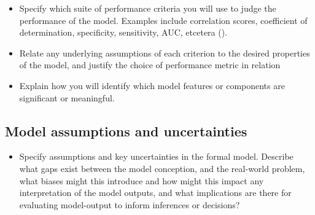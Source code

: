 \documentclass[
]{article}
\providecommand{\tightlist}{%
  \setlength{\itemsep}{0pt}\setlength{\parskip}{0pt}}
\begin{document}
\begin{tcolorbox}[enhanced jigsaw, opacitybacktitle=0.6, bottomrule=.15mm, leftrule=.75mm, rightrule=.15mm, colbacktitle=quarto-callout-caution-color!10!white, toprule=.15mm, titlerule=0mm, left=2mm, colframe=quarto-callout-caution-color-frame, breakable, title=\textcolor{quarto-callout-caution-color}{\faFire}\hspace{0.5em}{Preregistration Item}, opacityback=0, coltitle=black, bottomtitle=1mm, colback=white, toptitle=1mm, arc=.35mm]

\begin{itemize}
\tightlist
\item[$\square$]
  Specify which suite of performance criteria you will use to judge the
  performance of the model. Examples include correlation scores,
  coefficient of determination, specificity, sensitivity, AUC, etcetera
  ().
\item[$\square$]
  Relate any underlying assumptions of each criterion to the desired
  properties of the model, and justify the choice of performance metric
  in relation
\item[$\square$]
  Explain how you will identify which model features or components are
  significant or meaningful.
\end{itemize}

\end{tcolorbox}

\subsection{Model assumptions and
uncertainties}\label{model-assumptions-and-uncertainties-1}

\begin{tcolorbox}[enhanced jigsaw, opacitybacktitle=0.6, bottomrule=.15mm, leftrule=.75mm, rightrule=.15mm, colbacktitle=quarto-callout-caution-color!10!white, toprule=.15mm, titlerule=0mm, left=2mm, colframe=quarto-callout-caution-color-frame, breakable, title=\textcolor{quarto-callout-caution-color}{\faFire}\hspace{0.5em}{Preregistration Item}, opacityback=0, coltitle=black, bottomtitle=1mm, colback=white, toptitle=1mm, arc=.35mm]

\begin{itemize}
\tightlist
\item[$\square$]
  Specify assumptions and key uncertainties in the formal model.
  Describe what gaps exist between the model conception, and the
  real-world problem, what biases might this introduce and how might
  this impact any interpretation of the model outputs, and what
  implications are there for evaluating model-output to inform
  inferences or decisions?
\end{itemize}

\end{tcolorbox}
\end{document}
